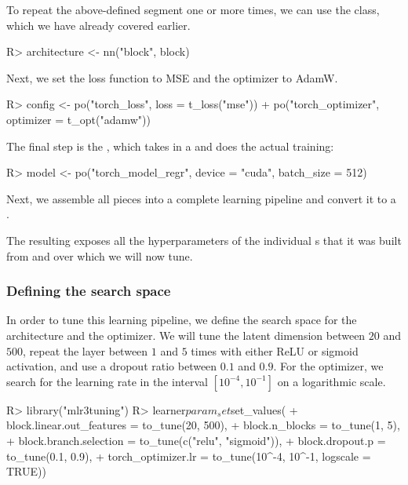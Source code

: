 \documentclass[article]{jss}
\theoremstyle{definition}
\begin{document}
To repeat the above-defined segment one or more times, we can use the  class, which we have already covered earlier.

\begin{CodeInput}
R> architecture <- nn("block", block) %
\end{CodeInput}

Next, we set the loss function to MSE and the optimizer to AdamW.

\begin{CodeInput}
R> config <- po("torch_loss", loss = t_loss("mse")) %
+    po("torch_optimizer", optimizer = t_opt("adamw"))
\end{CodeInput}

The final step is the , which takes in a  and does the actual training:

\begin{CodeInput}
R> model <- po("torch_model_regr", device = "cuda", batch_size = 512)
\end{CodeInput}

Next, we assemble all pieces into a complete learning pipeline and convert it to a .


The resulting  exposes all the hyperparameters of the individual s that it was built from and over which we will now tune.

\subsubsection{Defining the search space}
In order to tune this learning pipeline, we define the search space for the architecture and the optimizer.
We will tune the latent dimension between $20$ and $500$, repeat the layer between $1$ and $5$ times with either ReLU or sigmoid activation, and use a dropout ratio between $0.1$ and $0.9$.
For the optimizer, we search for the learning rate in the interval $[10^{-4}, 10^{-1}]$ on a logarithmic scale.

\begin{CodeInput}
R> library("mlr3tuning")
R> learner$param_set$set_values(
+    block.linear.out_features = to_tune(20, 500),
+    block.n_blocks = to_tune(1, 5),
+    block.branch.selection = to_tune(c("relu", "sigmoid")),
+    block.dropout.p = to_tune(0.1, 0.9),
+    torch_optimizer.lr = to_tune(10^-4, 10^-1, logscale = TRUE))
\end{CodeInput}
\end{document}
